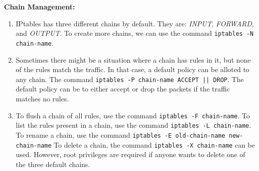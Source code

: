 \documentclass[12pt]{extarticle}
\begin{document}
\item \textbf{Chain Management:}
\begin{enumerate}

\item IPtables has three different chains by default. They are: \textit{INPUT}, \textit{FORWARD}, and \textit{OUTPUT}. To create more chains, we can use the command \texttt{iptables -N chain-name}.

\item Sometimes there might be a situation where a chain has rules in it, but none of the rules match the traffic. In that case, a default policy can be alloted to any chain. The command \texttt{iptables -P chain-name ACCEPT || DROP}. The default policy can be to either accept or drop the packets if the traffic matches no rules.

\item To flush a chain of all rules, use the command \texttt{iptables -F chain-name}. To list the rules present in a chain, use the command \texttt{iptables -L chain-name}. To rename a chain, use the command \texttt{iptables -E old-chain-name new-chain-name} To delete a chain, the command \texttt{iptables -X chain-name} can be used. However, root privileges are required if anyone wants to delete one of the three default chains. 

\end{enumerate}
\end{document}
